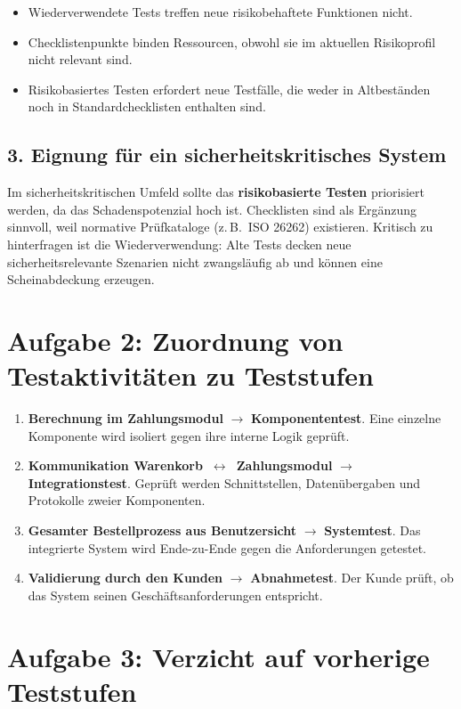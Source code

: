 \documentclass[
	fontsize=12pt,          %
	paper=a4,               %
	numbers=noenddot,       %
	listof=totoc,           %
	listof=entryprefix,     %
	listof=nochaptergap,    %
	bibliography=totoc,     %
	parskip=half,           %
	openany                 %
]{scrbook}
\begin{document}
\begin{itemize}
	\item Wiederverwendete Tests treffen neue risikobehaftete Funktionen nicht.
	\item Checklistenpunkte binden Ressourcen, obwohl sie im aktuellen Risikoprofil nicht relevant sind.
	\item Risikobasiertes Testen erfordert neue Testfälle, die weder in Altbeständen noch in Standardchecklisten enthalten sind.
\end{itemize}


\section*{3. Eignung für ein sicherheitskritisches System}

Im sicherheitskritischen Umfeld sollte das \textbf{risikobasierte Testen} priorisiert werden, da das Schadenspotenzial hoch ist.
Checklisten sind als Ergänzung sinnvoll, weil normative Prüfkataloge (z.\,B.\ ISO 26262) existieren.
Kritisch zu hinterfragen ist die Wiederverwendung: Alte Tests decken neue sicherheitsrelevante Szenarien nicht zwangsläufig ab und können eine Scheinabdeckung erzeugen.


\chapter*{Aufgabe 2: Zuordnung von Testaktivitäten zu Teststufen}

\begin{enumerate}
	\item \textbf{Berechnung im Zahlungsmodul} $\rightarrow$ \textbf{Komponententest}.
	      Eine einzelne Komponente wird isoliert gegen ihre interne Logik geprüft.
	\item \textbf{Kommunikation Warenkorb~$\leftrightarrow$~Zahlungsmodul} $\rightarrow$ \textbf{Integrationstest}.
	      Geprüft werden Schnittstellen, Datenübergaben und Protokolle zweier Komponenten.
	\item \textbf{Gesamter Bestellprozess aus Benutzersicht} $\rightarrow$ \textbf{Systemtest}.
	      Das integrierte System wird Ende-zu-Ende gegen die Anforderungen getestet.
	\item \textbf{Validierung durch den Kunden} $\rightarrow$ \textbf{Abnahmetest}.
	      Der Kunde prüft, ob das System seinen Geschäftsanforderungen entspricht.
\end{enumerate}


\chapter*{Aufgabe 3: Verzicht auf vorherige Teststufen}
\end{document}
